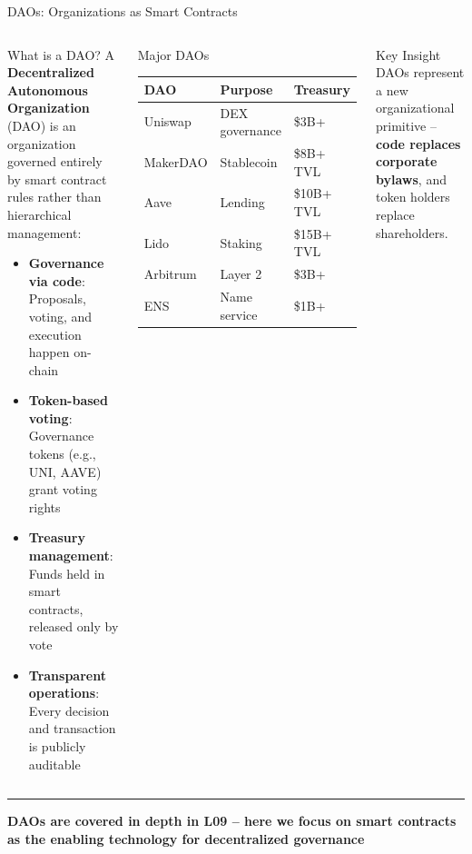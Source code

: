 \documentclass[8pt,aspectratio=169]{beamer}
\newcommand{\bottomnote}[1]{\vfill\vspace{-2mm}\textcolor{mllavender2}{\rule{\textwidth}{0.4pt}}\vspace{1mm}\footnotesize\textbf{#1}}
\begin{document}
\begin{frame}{DAOs: Organizations as Smart Contracts}
\begin{columns}[T]
\begin{block}{What is a DAO?}
\footnotesize
A \textbf{Decentralized Autonomous Organization} (DAO) is an organization governed entirely by smart contract rules rather than hierarchical management:
\begin{itemize}
  \item \textbf{Governance via code}: Proposals, voting, and execution happen on-chain
  \item \textbf{Token-based voting}: Governance tokens (e.g., UNI, AAVE) grant voting rights
  \item \textbf{Treasury management}: Funds held in smart contracts, released only by vote
  \item \textbf{Transparent operations}: Every decision and transaction is publicly auditable
\end{itemize}
\end{block}

\begin{block}{Major DAOs}
\footnotesize
\begin{tabular}{l l l}
\toprule
\textbf{DAO} & \textbf{Purpose} & \textbf{Treasury} \\
\midrule
\rowcolor{mllavender4}
Uniswap & DEX governance & \$3B+ \\
MakerDAO & Stablecoin & \$8B+ TVL \\
\rowcolor{mllavender4}
Aave & Lending & \$10B+ TVL \\
Lido & Staking & \$15B+ TVL \\
\rowcolor{mllavender4}
Arbitrum & Layer 2 & \$3B+ \\
ENS & Name service & \$1B+ \\
\bottomrule
\end{tabular}
\end{block}
\vspace{2mm}
\begin{exampleblock}{Key Insight}
\footnotesize
DAOs represent a new organizational primitive -- \textbf{code replaces corporate bylaws}, and token holders replace shareholders.
\end{exampleblock}
\end{columns}
\bottomnote{DAOs are covered in depth in L09 -- here we focus on smart contracts as the enabling technology for decentralized governance}
\end{frame}
\end{document}
